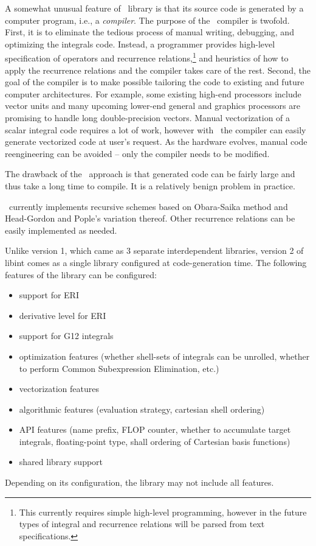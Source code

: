 \documentclass[12pt]{article}
\begin{document}
A somewhat unusual feature of \LIBINT\ library is that its source code is
generated by a computer program, i.e., a {\em compiler}. The purpose of the \LIBINT\ compiler is twofold.
First, it is to eliminate the tedious process of manual writing, debugging,
and optimizing the integrals code.
Instead, a programmer provides high-level specification of
operators and recurrence relations,\footnote{This currently
requires simple high-level programming, however in the future types of integral and recurrence relations
will be parsed from text specifications.}
and heuristics of how to apply the recurrence relations and the compiler takes care of the rest.
Second, the goal of the compiler is to make possible tailoring the code to existing
and future computer architectures. For example, some existing high-end processors
include vector units and many upcoming lower-end general and graphics processors
are promising to handle long double-precision vectors. Manual vectorization of a scalar integral code requires a lot of work,
however with \LIBINT\ the compiler can easily generate vectorized code at user's request. As the hardware
evolves, manual code reengineering can be avoided -- only the compiler needs to be modified.

The drawback of the \LIBINT\ approach is that generated code can be fairly large and thus take a long time to compile.
It is a relatively benign problem in practice.

\LIBINT\ currently implements recursive schemes based on Obara-Saika method\cite{Obara86} and Head-Gordon and Pople's
variation thereof.\cite{Head-Gordon88} Other recurrence relations can be easily implemented as needed.

Unlike version 1, which came as 3 separate interdependent libraries, version 2 of libint
comes as a single library configured at code-generation time.
The following features of the library can be configured:
\begin{itemize}
\item support for ERI
\item derivative level for ERI
\item support for G12 integrals
\item optimization features (whether shell-sets of integrals can be unrolled,
whether to perform Common Subexpression Elimination, etc.)
\item vectorization features
\item algorithmic features (evaluation strategy, cartesian shell ordering)
\item API features (name prefix, FLOP counter, whether to accumulate target integrals, floating-point type,
shall ordering of Cartesian basis functions)
\item shared library support
\end{itemize}
Depending on its configuration, the library may not include all features.
\end{document}
